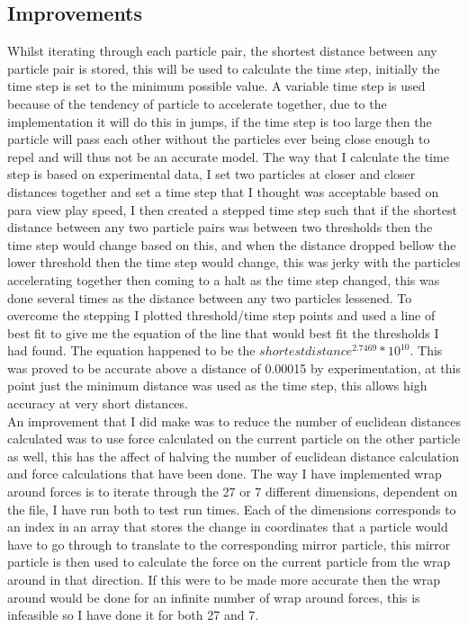 \documentclass[paper=a4, fontsize=11pt]{scrartcl}
\numberwithin{equation}{section}		%
\numberwithin{figure}{section}			%
\numberwithin{table}{section}				%
\begin{document}
\subsection{Improvements}
Whilst iterating through each particle pair, the shortest distance between any particle pair is stored, this will be used to calculate the time step, initially the time step is set to the minimum possible value. A variable time step is used because of the tendency of particle to accelerate together, due to the implementation it will do this in jumps, if the time step is too large then the particle will pass each other without the particles ever being close enough to repel and will thus not be an accurate model. The way that I calculate the time step is based on experimental data, I set two particles at closer and closer distances together and set a time step that I thought was acceptable based on para view play speed, I then created a stepped time step such that if the shortest distance between any two particle pairs was between two thresholds then the time step would change based on this, and when the distance dropped bellow the lower threshold then the time step would change, this was jerky with the particles accelerating together then coming to a halt as the time step changed, this was done several times as the distance between any two particles lessened. To overcome the stepping I plotted threshold/time step points and used a line of best fit to give me the equation of the line that would best fit the thresholds I had found. The equation happened to be the $shortest distance^{2.7469} * 10^{10}$. This was proved to be accurate above a distance of 0.00015 by experimentation, at this point just the minimum distance was used as the time step, this allows high accuracy at very short distances. \\
An improvement that I did make was to reduce the number of euclidean distances calculated was to use force calculated on the current particle on the other particle as well, this has the affect of halving the number of euclidean distance calculation and force calculations that have been done. The way I have implemented wrap around forces is to iterate through the 27 or 7 different dimensions, dependent on the file, I have run both to test run times. Each of the dimensions corresponds to an index in an array that stores the change in coordinates that a particle would have to go through to translate to the corresponding mirror particle, this mirror particle is then used to calculate the force on the current particle from the wrap around in that direction. If this were to be made more accurate then the wrap around would be done for an infinite number of wrap around forces, this is infeasible so I have done it for both 27 and 7.
\end{document}
